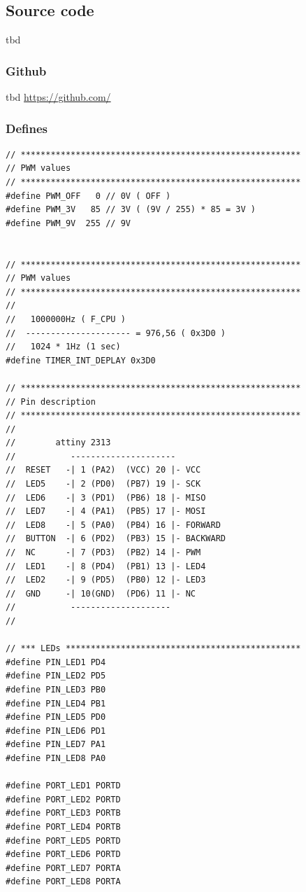 \subsection{Source code}
tbd %
\subsubsection{Github}

tbd %
\href{https://github.com/}{https://github.com/}
\vspace{0.5cm}

\subsubsection{Defines}
\begin{lstlisting}[caption={Defines},label=lst:defines]
// ********************************************************
// PWM values
// ********************************************************
#define PWM_OFF   0 // 0V ( OFF )
#define PWM_3V   85 // 3V ( (9V / 255) * 85 = 3V )
#define PWM_9V  255 // 9V


// ********************************************************
// PWM values
// ********************************************************
//
//   1000000Hz ( F_CPU )
//  --------------------- = 976,56 ( 0x3D0 )
//   1024 * 1Hz (1 sec)
#define TIMER_INT_DEPLAY 0x3D0

// ********************************************************
// Pin description
// ********************************************************
//
//		  attiny 2313
//           ---------------------
//  RESET   -| 1 (PA2)  (VCC) 20 |- VCC
//  LED5    -| 2 (PD0)  (PB7) 19 |- SCK
//  LED6    -| 3 (PD1)  (PB6) 18 |- MISO
//  LED7    -| 4 (PA1)  (PB5) 17 |- MOSI
//  LED8    -| 5 (PA0)  (PB4) 16 |- FORWARD
//  BUTTON  -| 6 (PD2)  (PB3) 15 |- BACKWARD
//  NC      -| 7 (PD3)  (PB2) 14 |- PWM
//  LED1    -| 8 (PD4)  (PB1) 13 |- LED4
//  LED2    -| 9 (PD5)  (PB0) 12 |- LED3
//  GND     -| 10(GND)  (PD6) 11 |- NC
//           --------------------
//

// *** LEDs ***********************************************
#define PIN_LED1 PD4
#define PIN_LED2 PD5
#define PIN_LED3 PB0
#define PIN_LED4 PB1
#define PIN_LED5 PD0
#define PIN_LED6 PD1
#define PIN_LED7 PA1
#define PIN_LED8 PA0

#define PORT_LED1 PORTD
#define PORT_LED2 PORTD
#define PORT_LED3 PORTB
#define PORT_LED4 PORTB
#define PORT_LED5 PORTD
#define PORT_LED6 PORTD
#define PORT_LED7 PORTA
#define PORT_LED8 PORTA


\end{lstlisting}
